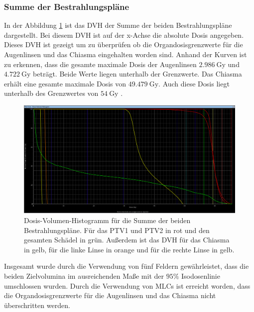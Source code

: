 \subsubsection*{Summe der Bestrahlungspläne}

In der Abbildung \ref{abb:DVHsum} ist das DVH der Summe der beiden Bestrahlungspläne dargestellt.
Bei diesem DVH ist auf der x-Achse die absolute Dosis angegeben. Dieses DVH ist gezeigt um zu überprüfen ob
die Organdosisgrenzwerte für die Augenlinsen und das Chiasma eingehalten worden sind.
Anhand der Kurven ist zu erkennen, dass die gesamte maximale Dosis der Augenlinsen $\SI{2.986}{\gray}$ und $\SI{4.722}{\gray}$ beträgt.
Beide Werte liegen unterhalb der Grenzwerte. Das Chiasma erhält eine gesamte maximale Dosis von $\SI{49.479}{\gray}$. Auch diese Dosis liegt unterhalb
des Grenzwertes von $\SI{54}{\gray}$ \cite{grenz}.

\begin{figure}[H]
  \centering
  \includegraphics[width=\textwidth]{Bilder/Teilhirn_vergleich2.png}
  \caption{Dosis-Volumen-Histogramm für die Summe der beiden Bestrahlungspläne. Für das PTV1 und PTV2 in rot und den gesamten Schädel in grün. Außerdem ist das DVH für das Chiasma in gelb, für die linke Linse in orange und für die rechte Linse in gelb.}
  \label{abb:DVHsum}
\end{figure}


Insgesamt wurde durch die Verwendung von fünf Feldern gewährleistet, dass die
beiden Zielvolumina im ausreichenden Maße mit der $95\%$ Isodosenlinie umschlossen wurden.
Durch die Verwendung von MLCs ist erreicht worden, dass die Organdosisgrenzwerte für
die Augenlinsen und das Chiasma nicht überschritten werden.
